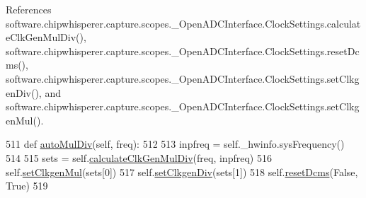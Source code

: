 References software.\+chipwhisperer.\+capture.\+scopes.\+\_\+\+Open\+A\+D\+C\+Interface.\+Clock\+Settings.\+calculate\+Clk\+Gen\+Mul\+Div(), software.\+chipwhisperer.\+capture.\+scopes.\+\_\+\+Open\+A\+D\+C\+Interface.\+Clock\+Settings.\+reset\+Dcms(), software.\+chipwhisperer.\+capture.\+scopes.\+\_\+\+Open\+A\+D\+C\+Interface.\+Clock\+Settings.\+set\+Clkgen\+Div(), and software.\+chipwhisperer.\+capture.\+scopes.\+\_\+\+Open\+A\+D\+C\+Interface.\+Clock\+Settings.\+set\+Clkgen\+Mul().


\begin{DoxyCode}
511     \textcolor{keyword}{def }\hyperlink{classsoftware_1_1chipwhisperer_1_1capture_1_1scopes_1_1__OpenADCInterface_1_1ClockSettings_a664617217bb75f19854db5474cf784d6}{autoMulDiv}(self, freq):
512 
513         inpfreq = self.\_hwinfo.sysFrequency()
514 
515         sets = self.\hyperlink{classsoftware_1_1chipwhisperer_1_1capture_1_1scopes_1_1__OpenADCInterface_1_1ClockSettings_af960ce57619c79148afa9ea0b68b7b55}{calculateClkGenMulDiv}(freq, inpfreq)
516         self.\hyperlink{classsoftware_1_1chipwhisperer_1_1capture_1_1scopes_1_1__OpenADCInterface_1_1ClockSettings_acd61b51fa06b1aaa49d5632fada5c49a}{setClkgenMul}(sets[0])
517         self.\hyperlink{classsoftware_1_1chipwhisperer_1_1capture_1_1scopes_1_1__OpenADCInterface_1_1ClockSettings_af0a2a436be03b94592bfcdfe62af41d9}{setClkgenDiv}(sets[1])
518         self.\hyperlink{classsoftware_1_1chipwhisperer_1_1capture_1_1scopes_1_1__OpenADCInterface_1_1ClockSettings_ac81b1c1353724814e4de7a6707d29a00}{resetDcms}(\textcolor{keyword}{False}, \textcolor{keyword}{True})
519 
\end{DoxyCode}
\hypertarget{classsoftware_1_1chipwhisperer_1_1capture_1_1scopes_1_1__OpenADCInterface_1_1ClockSettings_af960ce57619c79148afa9ea0b68b7b55}{}

